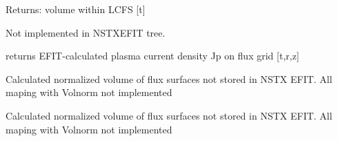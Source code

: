 \documentclass[letterpaper,10pt,english]{sphinxmanual}
\begin{document}
\begin{fulllineitems}
\begin{fulllineitems}
\end{fulllineitems}


\begin{fulllineitems}
\label{eqtools:eqtools.NSTXEFIT.NSTXEFITTree.getVolLCFS}
Returns:
volume within LCFS {[}t{]}

\end{fulllineitems}


\begin{fulllineitems}
\label{eqtools:eqtools.NSTXEFIT.NSTXEFITTree.getJp}
Not implemented in NSTXEFIT tree.

returns EFIT-calculated plasma current density Jp on flux grid {[}t,r,z{]}

\end{fulllineitems}


\begin{fulllineitems}
\label{eqtools:eqtools.NSTXEFIT.NSTXEFITTree.rz2volnorm}
Calculated normalized volume of flux surfaces not stored in NSTX EFIT. All maping with Volnorm
not implemented

\end{fulllineitems}


\begin{fulllineitems}
\label{eqtools:eqtools.NSTXEFIT.NSTXEFITTree.psinorm2volnorm}
Calculated normalized volume of flux surfaces not stored in NSTX EFIT. All maping with Volnorm
not implemented

\end{fulllineitems}


\end{fulllineitems}

\end{document}
